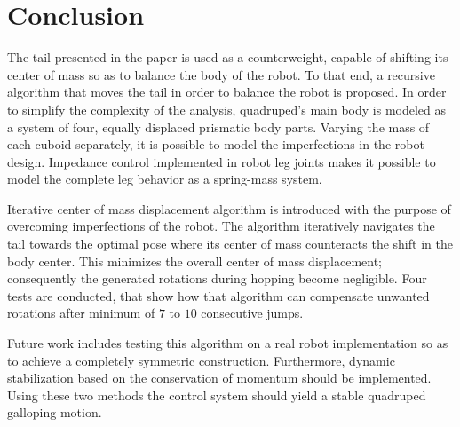 \section{Conclusion}\label{sec:conclusion}
 
The tail presented in the paper is used as a counterweight, capable of shifting its center of mass so as to balance the body of the robot. To that end, a recursive algorithm that moves the tail in order to balance the robot is proposed. In order to simplify the complexity of the analysis, quadruped's main body is modeled as a system of four, equally displaced prismatic body parts. Varying the mass of each cuboid separately, it is possible to model the imperfections in the robot design. Impedance control implemented in robot leg joints makes it possible to model the complete leg behavior as a spring-mass system.   

Iterative center of mass displacement algorithm is introduced with the purpose of overcoming imperfections of the robot. The algorithm iteratively navigates the tail towards the optimal pose where its center of mass counteracts the shift in the body center. This minimizes the overall center of mass displacement; consequently the generated rotations during hopping become negligible. Four tests are conducted, that show how that algorithm can compensate unwanted rotations after minimum of $7$ to $10$ consecutive jumps.

Future work includes testing this algorithm on a real robot implementation so as to achieve a completely symmetric construction. Furthermore, dynamic stabilization based on the conservation of momentum should be implemented. Using these two methods the control system should yield a stable quadruped galloping motion.
